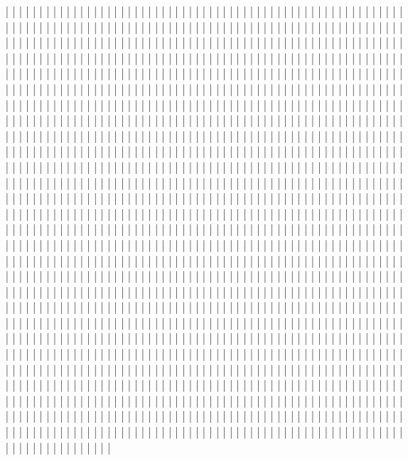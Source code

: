 | | | | | | | | | | | | | | | | | | | | | | | | | | | | | | | | | | | | | | | | | | | | | | | | | | | | | | | | | | | | | | | | | | | | | | | | | | | | | | | | | | | | | | | | | | | | | | | | | | | | | | | | | | | | | | | | | | | | | | | | | | | | | | | | | | | | | | | | | | | | | | | | | | | | | | | | | | | | | | | | | | | | | | | | | | | | | | | | | | | | | | | | | | | | | | | | | | | | | | | | | | | | | | | | | | | | | | | | | | | | | | | | | | | | | | | | | | | | | | | | | | | | | | | | | | | | | | | | | | | | | | | | | | | | | | | | | | | | | | | | | | | | | | | | | | | | | | | | | | | | | | | | | | | | | | | | | | | | | | | | | | | | | | | | | | | | | | | | | | | | | | | | | | | | | | | | | | | | | | | | | | | | | | | | | | | | | | | | | | | | | | | | | | | | | | | | | | | | | | | | | | | | | | | | | | | | | | | | | | | | | | | | | | | | | | | | | | | | | | | | | | | | | | | | | | | | | | | | | | | | | | | | | | | | | | | | | | | | | | | | | | | | | | | | | | | | | | | | | | | | | | | | | | | | | | | | | | | | | | | | | | | | | | | | | | | | | | | | | | | | | | | | | | | | | | | | | | | | | | | | | | | | | | | | | | | | | | | | | | | | | | | | | | | | | | | | | | | | | | | | | | | | | | | | | | | | | | | | | | | | | | | | | | | | | | | | | | | | | | | | | | | | | | | | | | | | | | | | | | | | | | | | | | | | | | | | | | | | | | | | | | | | | | | | | | | | | | | | | | | | | | | | | | | | | | | | | | | | | | | | | | | | | | | | | | | | | | | | | | | | | | | | | | | | | | | | | | | | | | | | | | | | | | | | | | | | | | | | | | | | | | | | | | | | | | | | | | | | | | | | | | | | | | | | | | | | | | | | | | | | | | | | | | | | | | | | | | | | | | | | | | | | | | | | | | | | | | | | | | | | | | | | | | | | | | | | | | | | | | | | | | | | | | | | | | | | | | | | | | | | | | | | | | | | | | | | | | | | | | | | | | | | | | | | | | | | | | | | | | | | | | | | | | | | | | | | | | | | | | | | | | | | | | | | | | | | | | | | | | | | | | | | | | | | | | | | | | | | | | | | | | | | | | | | | | | | | | | | | | | | | | | | | | | | | | | | | | | | | | | | | | | | | | | | | | | | | | | | | | | | | | | | | | | | | | | | | | | | | | | | | | | | | | | | | | | | | | | | | | | | | | | | | | | | | | | | | | | | | | | | | | | | | | | | | | | | | | | | | | | | | | | | | | | | | | | | | | | | | | | | | | | | | | | | | | | | | | | | | | | | | | | | | | | | | | | | | | | | | | | | | | | | | | | | | | | | | | | | | | | | | | | | | | | | | | | | | | | | | | | | | | | | | | | | | | | | | | | | | | | | | | | | | | | | | | | | | | | | | | | | | | | | | | | | | | | | | | | | | | | | | | | | | | | | | | | | | | | | | | | | | | | | | | | | | | | | | | | | | | | | | | | | | | | | | | | | | | | | | | | | | | | | | | | | | | | | | | | | | | | | | | | | | | | | | | | | | | | | | | | | | | | | | | | | | | | | | | | | | | | | | | | | | | | | | | | | | | | | | | | | | | | | | | | | | | | | | | | | | | | | | | | | | | | | | | | | | | | | | | | | | | | | | | | | | | | | | | | | | | | | | | | | | | | | | | | | | | | | | | | | | | | | | | | | | | | | | | | | | | | | | | | | | | | | | | | | | | | | | | | | | | | | | | | | | | | | | | | | | | | | | | | | | | | | | | | | | | | | | | | | | | | | | | | | | | | | | | | | | | | | | | | | | | | | | | | | | | | | | | | | | | | | | | | | | | | | | | | | | | | | | | | | | | | | 